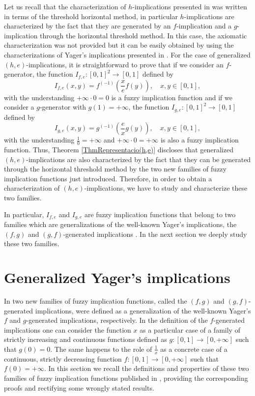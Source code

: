 Let us recall that the characterization of $h$-implications presented in \cite{Massanet2012A} was written in terms of the threshold horizontal method, in particular $h$-implications are characterized by the fact that they are generated by an $f$-implication and a $g$-implication through the horizontal threshold method. In this case, the axiomatic characterization was not provided but it can be easily obtained by using the characterizations of Yager's implications presented in \cite{Massanet2012B}. For the case of generalized $(h,e)$-implications, it is straightforward to prove that if we consider an $f$-generator, the function $I_{f,e}:[0,1]^2 \to [0,1]$ defined by
$$I_{f,e}(x,y)=f^{(-1)}\left(\frac{x}{e}f(y)\right), \quad x,y \in [0,1],$$
with the understanding $+ \infty \cdot 0 = 0$ is a fuzzy implication function and if we consider a $g$-generator with $g(1)=+\infty$, the function $I_{g,e}:[0,1]^2 \to [0,1]$ defined by
$$I_{g,e}(x,y)=g^{(-1)}\left(\frac{e}{x}g(y)\right), \quad x,y \in [0,1],$$
with the understanding $\frac{1}{0}=+\infty$ and $+\infty \cdot 0 =+\infty$ is also a fuzzy implication function. Thus, Theorem \ref{ThmRepresentacio(h,e)} discloses that generalized $(h,e)$-implications are also characterized by the fact that they can be generated through the horizontal threshold method by the two new families of fuzzy implication functions just introduced.  Therefore, in order to obtain a characterization of $(h,e)$-implications, we have to study and characterize these two families.

In particular, $I_{f,e}$ and $I_{g,e}$ are fuzzy implication functions that belong to two families which are generalizations of the well-known Yager's implications, the $(f,g)$ and $(g,f)$-generated implications \cite{Massanet2013B}. In the next section we deeply study these two families.


\section{Generalized Yager's implications}\label{section:(f,g)&(g,f)}

In \cite{Massanet2013B} two new families of fuzzy implication functions, called the $(f,g)$ and $(g,f)$-generated implications, were defined as a generalization of the well-known Yager's $f$ and $g$-generated implications, respectively. In the definition of the $f$-generated implications one can consider the function $x$ as a particular case of a family of strictly increasing and continuous  functions defined as $g:[0,1] \to [0,+\infty]$ such that $g(0)=0$. The same happens to the role of $\frac{1}{x}$ as a concrete case of a continuous, strictly decreasing function $f:[0,1] \to [0,+\infty]$ such that $f(0)=+\infty$. In this section we recall the definitions and properties of these two families of fuzzy implication functions published in \cite{Massanet2013B}, providing the corresponding proofs and rectifying some  wrongly stated results.

